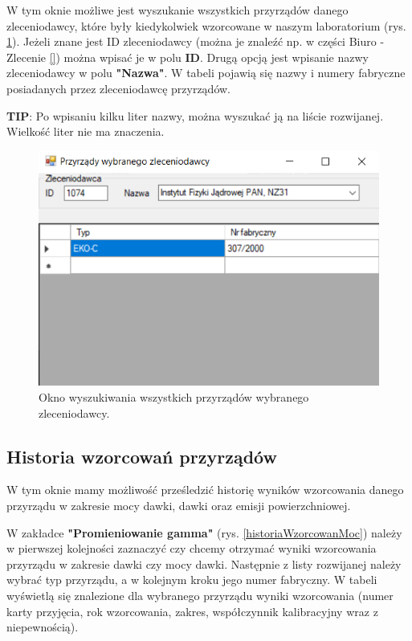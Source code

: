 W tym oknie możliwe jest wyszukanie wszystkich przyrządów danego zleceniodawcy, które były kiedykolwiek wzorcowane w naszym laboratorium (rys. \ref{przyrzadyZleceniodawcy}). Jeżeli znane jest ID zleceniodawcy (można je znaleźć np. w części Biuro - Zlecenie \ref{}) można wpisać je w polu \textbf{ID}. Drugą opcją jest wpisanie nazwy zleceniodawcy w polu \textbf{"Nazwa"}. W tabeli pojawią się nazwy i numery fabryczne posiadanych przez zleceniodawcę przyrządów.

\textbf{TIP}: Po wpisaniu kilku liter nazwy, można wyszukać ją na liście rozwijanej. Wielkość liter nie ma znaczenia.

\begin{figure}[htb]
	\centering
	\includegraphics{obrazki/Wyszukiwanie/Zleceniodawcy/przyrzady_zleceniodawcy.png}
	\caption{Okno wyszukiwania wszystkich przyrządów wybranego zleceniodawcy.}
	\label{przyrzadyZleceniodawcy}
\end{figure}

\subsection{Historia wzorcowań przyrządów}
\label{historia_wzorcowań}

W tym oknie mamy możliwość prześledzić historię wyników wzorcowania danego przyrządu w zakresie mocy dawki, dawki oraz emisji powierzchniowej.

W zakładce \textbf{"Promieniowanie gamma"} (rys. \ref{historiaWzorcowanMoc}) należy w pierwszej kolejności zaznaczyć czy chcemy otrzymać wyniki wzorcowania przyrządu w zakresie dawki czy mocy dawki. Następnie z listy rozwijanej należy wybrać typ przyrządu, a w kolejnym kroku jego numer fabryczny. W tabeli wyświetlą się znalezione dla wybranego przyrządu wyniki wzorcowania (numer karty przyjęcia, rok wzorcowania, zakres, współczynnik kalibracyjny wraz z niepewnością).

